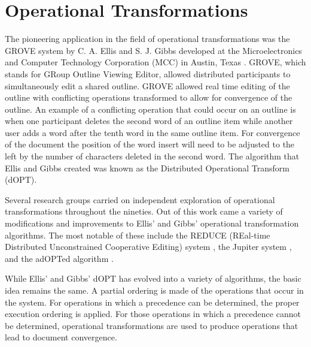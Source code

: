 \documentclass{article}
\begin{document}
\section{Operational Transformations}

The pioneering application in the field of operational transformations
was the GROVE system by C. A. Ellis and S. J. Gibbs developed at the
Microelectronics and Computer Technology Corporation (MCC) in Austin,
Texas \cite{grove}.  GROVE, which stands for GRoup Outline Viewing
Editor, allowed distributed participants to simultaneously edit a
shared outline.  GROVE allowed real time editing of the outline with
conflicting operations transformed to allow for convergence of the
outline.  An example of a conflicting operation that could occur on an
outline is when one participant deletes the second word of an outline
item while another user adds a word after the tenth word in the same
outline item.  For convergence of the document the position of the
word insert will need to be adjusted to the left by the number of
characters deleted in the second word.  The algorithm that Ellis and
Gibbs created was known as the Distributed Operational Transform
(dOPT).

Several research groups carried on independent exploration of
operational transformations throughout the nineties.
Out of this work came a variety of modifications and
improvements to Ellis' and Gibbs' operational transformation
algorithms.  The most notable of these include the REDUCE (REal-time
Distributed Unconstrained Cooperative Editing) system \cite{reduce},
the Jupiter system \cite{jupiter}, and the adOPTed algorithm
\cite{adopted}.

While Ellis' and Gibbs' dOPT has evolved into a variety of algorithms,
the basic idea remains the same.  A partial ordering is made of the
operations that occur in the system.  For operations in which a
precedence can be determined, the proper execution ordering is
applied.  For those operations in which a precedence cannot be
determined, operational transformations are used to produce operations
that lead to document convergence.
\end{document}
